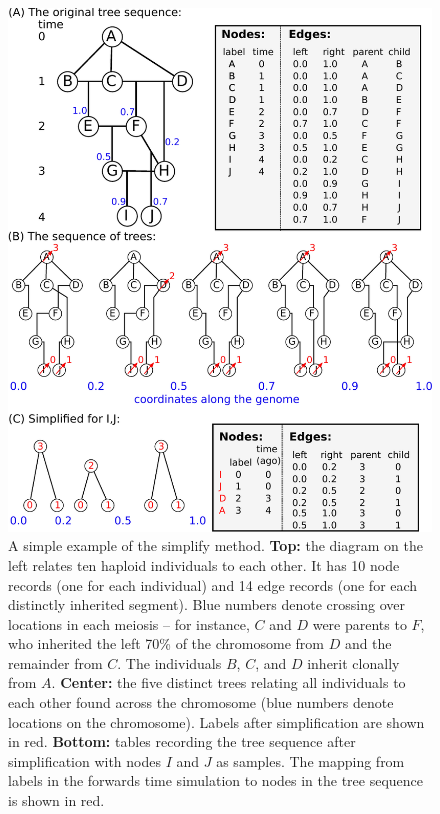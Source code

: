 \documentclass{article}
\begin{document}
\begin{figure}
    \begin{center}
        \includegraphics{method_diagram}
    \end{center}
    \caption{
        A simple example of the simplify method.
        \textbf{Top:} the diagram on the left relates ten haploid individuals to each other.
        It has 10 node records (one for each individual)
        and 14 edge records (one for each distinctly inherited segment).
        Blue numbers denote crossing over locations in each meiosis --
        for instance, $C$ and $D$ were parents to $F$,
        who inherited the left 70\% of the chromosome from $D$ and the remainder from $C$.
        The individuals $B$, $C$, and $D$ inherit clonally from $A$.
        \textbf{Center:} the five distinct trees relating all individuals to each other
        found across the chromosome (blue numbers denote locations on the chromosome).
        Labels after simplification are shown in red.
        \textbf{Bottom:} tables recording the tree sequence after simplification
        with nodes $I$ and $J$ as samples.
        The mapping from labels in the forwards time simulation to nodes in the tree sequence
        is shown in red.
        \label{fig:method_diagram}
    }
\end{figure}
\end{document}
